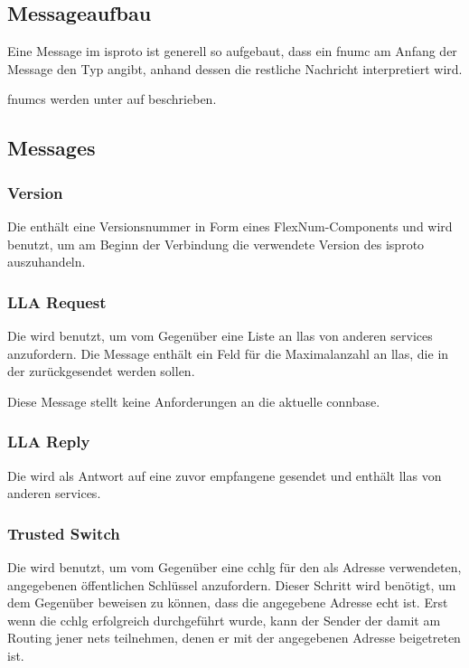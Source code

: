 \subsection{Messageaufbau}
Eine Message im \gls{isproto} ist generell so aufgebaut, dass ein \gls{fnumc} am Anfang der
Message den Typ angibt, anhand dessen die restliche Nachricht interpretiert wird.

\Glspl{fnumc} werden unter  auf
 beschrieben.

\isprotobytefield

\subsection{Messages}

\subsubsection{Version}
\label{dcl-isproto-version}
Die \msg{\isprotoversion} enthält eine Versionsnummer in Form eines FlexNum-Components und wird
benutzt, um am Beginn der Verbindung die verwendete Version des \gls{isproto} auszuhandeln.

\isprotoversionbytefield

\subsubsection{LLA Request}
\label{dcl-isproto-llareq}
Die \msg{\isprotollareq} wird benutzt, um vom Gegenüber eine Liste an \glspl{lla} von anderen
\glspl{service} anzufordern.
Die Message enthält ein Feld für die Maximalanzahl an \glspl{lla}, die in der
\msg{\isprotollarep} zurückgesendet werden sollen.

Diese Message stellt keine Anforderungen an die aktuelle \gls{connbase}.

\isprotollareqbytefield


\subsubsection{LLA Reply}
\label{dcl-isproto-llarep}
Die \msg{\isprotollarep} wird als Antwort auf eine zuvor empfangene \msg{\isprotollareq} gesendet
und enthält \glspl{lla} von anderen \glspl{service}.

\isprotollarepbytefield


\subsubsection{Trusted Switch}
\label{dcl-isproto-ts}
Die \msg{\isprotots} wird benutzt, um vom Gegenüber eine \gls{cchlg} für den als Adresse verwendeten,
angegebenen öffentlichen Schlüssel anzufordern. Dieser Schritt wird benötigt, um dem Gegenüber beweisen
zu können, dass die angegebene Adresse echt ist. Erst wenn die \gls{cchlg} erfolgreich durchgeführt
wurde, kann der Sender der \msg{\isprotots} damit am Routing jener \glspl{net} teilnehmen, denen er
mit der angegebenen Adresse beigetreten ist.

